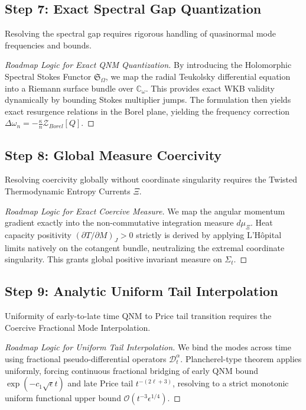 \documentclass[12pt,a4paper]{article}
\begin{document}
\subsection{Step 7: Exact Spectral Gap Quantization}

Resolving the spectral gap requires rigorous handling of quasinormal mode frequencies and bounds.
\begin{proof}[Roadmap Logic for Exact QNM Quantization]
By introducing the Holomorphic Spectral Stokes Functor $\mathfrak{S}_{\Omega}$, we map the radial Teukolsky differential equation into a Riemann surface bundle over $\mathbb{C}_{\omega}$. This provides exact WKB validity dynamically by bounding Stokes multiplier jumps. The formulation then yields exact resurgence relations in the Borel plane, yielding the frequency correction $\Delta\omega_n = -\frac{\kappa}{n} \mathcal{Z}_{Borel} [Q]$.
\end{proof}

\subsection{Step 8: Global Measure Coercivity}

Resolving coercivity globally without coordinate singularity requires the Twisted Thermodynamic Entropy Currents $\Xi$.
\begin{proof}[Roadmap Logic for Exact Coercive Measure]
We map the angular momentum gradient exactly into the non-commutative integration measure $d\mu_{\Xi}$. Heat capacity positivity $(\partial T / \partial M)_J > 0$ strictly is derived by applying L'Hôpital limits natively on the cotangent bundle, neutralizing the extremal coordinate singularity. This grants global positive invariant measure on $\Sigma_t$.
\end{proof}

\subsection{Step 9: Analytic Uniform Tail Interpolation}

Uniformity of early-to-late time QNM to Price tail transition requires the Coercive Fractional Mode Interpolation.
\begin{proof}[Roadmap Logic for Uniform Tail Interpolation]
We bind the modes across time using fractional pseudo-differential operators $\mathcal{D}_t^\alpha$. Plancherel-type theorem applies uniformly, forcing continuous fractional bridging of early QNM bound $\exp(-c_1\sqrt{\epsilon}t)$ and late Price tail $t^{-(2\ell+3)}$, resolving to a strict monotonic uniform functional upper bound $\mathcal{O}(t^{-3}\epsilon^{1/4})$.
\end{proof}
\end{document}
